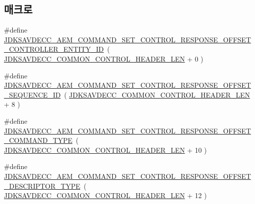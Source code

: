 \subsection*{매크로}
\begin{DoxyCompactItemize}
\item 
\#define \hyperlink{group__command__set__control__response_gaae6287ac37a2c8584c0bbd4485dc474d}{J\+D\+K\+S\+A\+V\+D\+E\+C\+C\+\_\+\+A\+E\+M\+\_\+\+C\+O\+M\+M\+A\+N\+D\+\_\+\+S\+E\+T\+\_\+\+C\+O\+N\+T\+R\+O\+L\+\_\+\+R\+E\+S\+P\+O\+N\+S\+E\+\_\+\+O\+F\+F\+S\+E\+T\+\_\+\+C\+O\+N\+T\+R\+O\+L\+L\+E\+R\+\_\+\+E\+N\+T\+I\+T\+Y\+\_\+\+ID}~( \hyperlink{group__jdksavdecc__avtp__common__control__header_gaae84052886fb1bb42f3bc5f85b741dff}{J\+D\+K\+S\+A\+V\+D\+E\+C\+C\+\_\+\+C\+O\+M\+M\+O\+N\+\_\+\+C\+O\+N\+T\+R\+O\+L\+\_\+\+H\+E\+A\+D\+E\+R\+\_\+\+L\+EN} + 0 )
\item 
\#define \hyperlink{group__command__set__control__response_ga22e41eb0ee1d7488a4a775157eb9e448}{J\+D\+K\+S\+A\+V\+D\+E\+C\+C\+\_\+\+A\+E\+M\+\_\+\+C\+O\+M\+M\+A\+N\+D\+\_\+\+S\+E\+T\+\_\+\+C\+O\+N\+T\+R\+O\+L\+\_\+\+R\+E\+S\+P\+O\+N\+S\+E\+\_\+\+O\+F\+F\+S\+E\+T\+\_\+\+S\+E\+Q\+U\+E\+N\+C\+E\+\_\+\+ID}~( \hyperlink{group__jdksavdecc__avtp__common__control__header_gaae84052886fb1bb42f3bc5f85b741dff}{J\+D\+K\+S\+A\+V\+D\+E\+C\+C\+\_\+\+C\+O\+M\+M\+O\+N\+\_\+\+C\+O\+N\+T\+R\+O\+L\+\_\+\+H\+E\+A\+D\+E\+R\+\_\+\+L\+EN} + 8 )
\item 
\#define \hyperlink{group__command__set__control__response_ga4dd7b49731c74bdd715ce5c93e9f93fc}{J\+D\+K\+S\+A\+V\+D\+E\+C\+C\+\_\+\+A\+E\+M\+\_\+\+C\+O\+M\+M\+A\+N\+D\+\_\+\+S\+E\+T\+\_\+\+C\+O\+N\+T\+R\+O\+L\+\_\+\+R\+E\+S\+P\+O\+N\+S\+E\+\_\+\+O\+F\+F\+S\+E\+T\+\_\+\+C\+O\+M\+M\+A\+N\+D\+\_\+\+T\+Y\+PE}~( \hyperlink{group__jdksavdecc__avtp__common__control__header_gaae84052886fb1bb42f3bc5f85b741dff}{J\+D\+K\+S\+A\+V\+D\+E\+C\+C\+\_\+\+C\+O\+M\+M\+O\+N\+\_\+\+C\+O\+N\+T\+R\+O\+L\+\_\+\+H\+E\+A\+D\+E\+R\+\_\+\+L\+EN} + 10 )
\item 
\#define \hyperlink{group__command__set__control__response_ga77a1692e0633e47d9f2d2437f66974ed}{J\+D\+K\+S\+A\+V\+D\+E\+C\+C\+\_\+\+A\+E\+M\+\_\+\+C\+O\+M\+M\+A\+N\+D\+\_\+\+S\+E\+T\+\_\+\+C\+O\+N\+T\+R\+O\+L\+\_\+\+R\+E\+S\+P\+O\+N\+S\+E\+\_\+\+O\+F\+F\+S\+E\+T\+\_\+\+D\+E\+S\+C\+R\+I\+P\+T\+O\+R\+\_\+\+T\+Y\+PE}~( \hyperlink{group__jdksavdecc__avtp__common__control__header_gaae84052886fb1bb42f3bc5f85b741dff}{J\+D\+K\+S\+A\+V\+D\+E\+C\+C\+\_\+\+C\+O\+M\+M\+O\+N\+\_\+\+C\+O\+N\+T\+R\+O\+L\+\_\+\+H\+E\+A\+D\+E\+R\+\_\+\+L\+EN} + 12 )
\item 

\end{DoxyCompactItemize}
